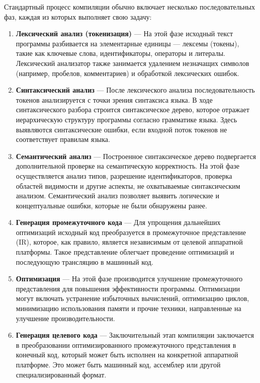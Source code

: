 \documentclass[14pt, russian]{scrartcl}
\begin{document}
Стандартный процесс компиляции обычно включает несколько последовательных фаз, каждая из которых выполняет свою задачу:

\begin{enumerate}
	\item \textbf{Лексический анализ (токенизация)} --- На этой фазе исходный текст программы разбивается на
	элементарные единицы — лексемы (токены), такие как ключевые слова, идентификаторы, операторы и литералы.
	Лексический анализатор также занимается удалением незначащих символов (например, пробелов, комментариев)
	и обработкой лексических ошибок.

	\item \textbf{Синтаксический анализ} --- После лексического анализа последовательность токенов анализируется
	с точки зрения синтаксиса языка. В ходе синтаксического разбора строится синтаксическое дерево,
	которое отражает иерархическую структуру программы согласно грамматике языка. Здесь выявляются синтаксические
	ошибки, если входной поток токенов не соответствует правилам языка.

	\item \textbf{Семантический анализ} --- Построенное синтаксическое дерево подвергается дополнительной проверке
	на семантическую корректность. На этой фазе осуществляется анализ типов, разрешение идентификаторов,
	проверка областей видимости и другие аспекты, не охватываемые синтаксическим анализом. Семантический анализ
	позволяет выявить логические и концептуальные ошибки, которые не были обнаружены ранее.

	\item \textbf{Генерация промежуточного кода} --- Для упрощения дальнейших оптимизаций исходный код преобразуется
	в промежуточное представление (IR), которое, как правило, является независимым от целевой аппаратной платформы.
	Такое представление облегчает проведение оптимизаций и последующую трансляцию в машинный код.

	\item \textbf{Оптимизация} --- На этой фазе производится улучшение промежуточного представления для повышения
	эффективности программы. Оптимизации могут включать устранение избыточных вычислений, оптимизацию циклов,
	минимизацию использования памяти и прочие техники, направленные на улучшение производительности.

	\item \textbf{Генерация целевого кода} --- Заключительный этап компиляции заключается в преобразовании
	оптимизированного промежуточного представления в конечный код, который может быть исполнен на конкретной
	аппаратной платформе. Это может быть машинный код, ассемблер или другой специализированный формат.
\end{enumerate}
\end{document}
